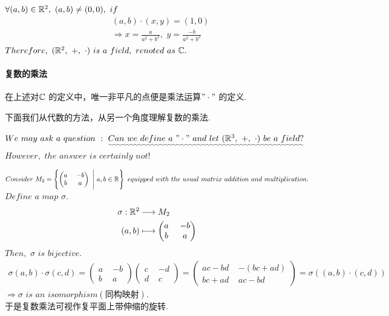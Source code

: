 	\vspace*{2em}
	$\forall (a , b) \in \mathbb{R}^2 , \,\, (a , b) \neq (0 , 0) , \,\, if$
	\begin{align}
		&(a , b) \cdot (x , y) = (1 , 0) \\
		&\Rightarrow x = \frac{a}{a^2 + b^2} , \,\, y = \frac{-b}{a^2 + b^2}
	\end{align}
	$Therefore , \,\, (\mathbb{R}^2 , \,\, + , \,\, \cdot) \,\, is \,\, a \,\, field , \,\, renoted \,\, as \,\, \mathbb{C}.$
	
\vspace*{2em}
\paragraph{复数的乘法}
	在上述对$\mathbb{C}$ 的定义中，唯一非平凡的点便是乘法运算$"\cdot"$ 的定义.
\begin{center}
	下面我们从代数的方法，从另一个角度理解复数的乘法.
\end{center}
	$We \,\, may \,\, ask \,\, a \,\, question \,\, : \,\, \uwave{Can \,\, we \,\, define \,\, a \,\, "\cdot" \,\, and  \,\, let \,\, (\R^3 , \,\, + , \,\, \cdot) \,\, be \,\, a \,\, field?}$\\
	$However , \,\, the \,\, answer \,\, is \,\, certainly \,\, not !$
	
	\vspace*{2em}
		$Consider \,\, M_2 = 
		\left\{ 
		\begin{pmatrix}
			a \,\, &-b\\
			b \,\, &a
		\end{pmatrix} \,\, \Bigg| \,\, a , b \in \mathbb{R}
		\right\}
		\,\, equipped \,\, with \,\, the \,\, usual \,\, matrix \,\, addition \,\, and \,\, multiplication.$\\
		
	$Define \,\, a \,\, map \,\, \sigma.$
	\begin{align}
		\sigma : \mathbb{R}^2 &\longrightarrow M_2 \\
		(a , b) &\longmapsto 
		\begin{pmatrix}
			a \,\, &-b\\
			b \,\, &a
		\end{pmatrix}
	\end{align}
	$Then , \,\, \sigma \,\, is \,\, bijective.$
	\begin{align}
		\sigma(a , b) \cdot \sigma(c , d) = 
		\begin{pmatrix}
			a \,\, &-b\\
			b \,\, &a
		\end{pmatrix} 
		\begin{pmatrix}
			c \,\, &-d\\
			d \,\, &c
		\end{pmatrix}
		= 
		\begin{pmatrix}
			ac - bd \,\, &-(bc + ad)\\
			bc + ad \,\, &ac - bd
		\end{pmatrix}
		= 
		\sigma((a , b) \cdot (c , d))
	\end{align}
	$\Rightarrow \sigma \,\, is \,\, an \,\, isomorphism(\text{同构映射}).$ \\
	于是复数乘法可视作复平面上带伸缩的旋转.	
	
